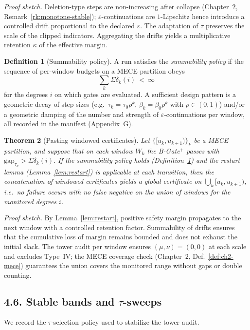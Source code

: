 \documentclass[11pt]{article}
\numberwithin{equation}{section}
\newtheorem{theorem}{Theorem}[section]
\theoremstyle{definition}
\newtheorem{definition}[theorem]{Definition}
\begin{document}
\noindent\emph{Proof sketch.} Deletion-type steps are non-increasing after collapse (Chapter~2, Remark~\ref{rk:monotone-stable}); $\varepsilon$-continuations are $1$-Lipschitz hence introduce a controlled drift proportional to the declared $\varepsilon$. The adaptation of $\tau$ preserves the scale of the clipped indicators. Aggregating the drifts yields a multiplicative retention $\kappa$ of the effective margin.

\begin{definition}[Summability policy]\label{def:summability}
A run satisfies the \emph{summability policy} if the sequence of per-window budgets on a MECE partition obeys
\[
\sum_k \Sigma\delta_k(i)\ <\ \infty
\]
for the degrees $i$ on which gates are evaluated. A sufficient design pattern is a geometric decay of step sizes (e.g.\ $\tau_k=\tau_0\rho^k$, $\beta_k=\beta_0\rho^k$ with $\rho\in (0,1)$) and/or a geometric damping of the number and strength of $\varepsilon$-continuations per window, all recorded in the manifest (Appendix~G).
\end{definition}

\begin{theorem}[Pasting windowed certificates]\label{thm:pasting}
Let $\{[u_k,u_{k+1})\}_k$ be a MECE partition, and suppose that on each window $W_k$ the B-Gate$^{+}$ passes with $\mathrm{gap}_{\tau_k}>\Sigma\delta_k(i)$. If the summability policy holds (Definition~\ref{def:summability}) and the restart lemma (Lemma~\ref{lem:restart}) is applicable at each transition, then the concatenation of windowed certificates yields a global certificate on $\bigcup_k [u_k,u_{k+1})$, i.e.\ no failure occurs with no false negative on the union of windows for the monitored degrees $i$.
\end{theorem}

\noindent\emph{Proof sketch.} By Lemma~\ref{lem:restart}, positive safety margin propagates to the next window with a controlled retention factor. Summability of drifts ensures that the cumulative loss of margin remains bounded and does not exhaust the initial slack. The tower audit per window ensures $(\mu,\nu)=(0,0)$ at each scale and excludes Type~IV; the MECE coverage check (Chapter~2, Def.~\ref{def:ch2-mece}) guarantees the union covers the monitored range without gaps or double counting.

\subsection*{4.6. Stable bands and $\tau$-sweeps}
We record the $\tau$-selection policy used to stabilize the tower audit.
\end{document}
